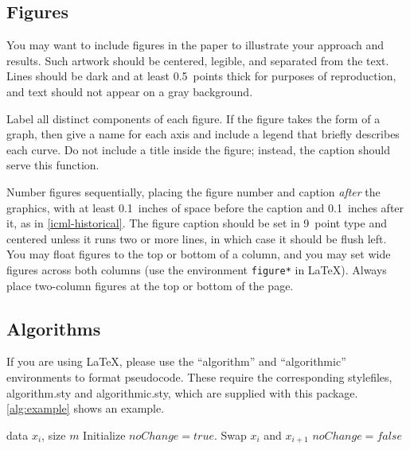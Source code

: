 \documentclass{article}
\theoremstyle{plain}
\theoremstyle{definition}
\theoremstyle{remark}
\begin{document}
\subsection{Figures}

You may want to include figures in the paper to illustrate your approach and
results. Such artwork should be centered, legible, and separated from the text.
Lines should be dark and at least 0.5~points thick for purposes of
reproduction, and text should not appear on a gray background.

Label all distinct components of each figure. If the figure takes the form of a
graph, then give a name for each axis and include a legend that briefly
describes each curve. Do not include a title inside the figure; instead, the
caption should serve this function.

Number figures sequentially, placing the figure number and caption \emph{after}
the graphics, with at least 0.1~inches of space before the caption and
0.1~inches after it, as in \cref{icml-historical}. The figure caption should be
set in 9~point type and centered unless it runs two or more lines, in which
case it should be flush left. You may float figures to the top or bottom of a
column, and you may set wide figures across both columns (use the environment
\texttt{figure*} in \LaTeX). Always place two-column figures at the top or
bottom of the page.

\subsection{Algorithms}

If you are using \LaTeX, please use the ``algorithm'' and ``algorithmic''
environments to format pseudocode. These require the corresponding stylefiles,
algorithm.sty and algorithmic.sty, which are supplied with this package.
\cref{alg:example} shows an example.

\begin{algorithm}[tb]
  \caption{Bubble Sort}
  \label{alg:example}
  \begin{algorithmic}
     data $x_i$, size $m$
    \REPEAT
    \STATE Initialize $noChange = true$.
    \STATE Swap $x_i$ and $x_{i+1}$
    \STATE $noChange = false$
    \ENDIF
    \ENDFOR
  \end{algorithmic}
\end{algorithm}
\end{document}
